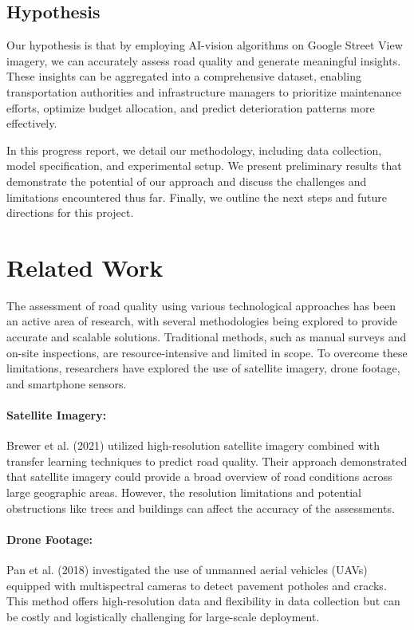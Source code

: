 \documentclass{article}
\begin{document}
\subsection{Hypothesis}
Our hypothesis is that by employing AI-vision algorithms on Google Street View imagery, we can accurately assess road quality and generate meaningful insights. These insights can be aggregated into a comprehensive dataset, enabling transportation authorities and infrastructure managers to prioritize maintenance efforts, optimize budget allocation, and predict deterioration patterns more effectively.

In this progress report, we detail our methodology, including data collection, model specification, and experimental setup. We present preliminary results that demonstrate the potential of our approach and discuss the challenges and limitations encountered thus far. Finally, we outline the next steps and future directions for this project.


\section{Related Work}

The assessment of road quality using various technological approaches has been an active area of research, with several methodologies being explored to provide accurate and scalable solutions. Traditional methods, such as manual surveys and on-site inspections, are resource-intensive and limited in scope. To overcome these limitations, researchers have explored the use of satellite imagery, drone footage, and smartphone sensors.

\paragraph{Satellite Imagery:}
Brewer et al. (2021) utilized high-resolution satellite imagery combined with transfer learning techniques to predict road quality. Their approach demonstrated that satellite imagery could provide a broad overview of road conditions across large geographic areas. However, the resolution limitations and potential obstructions like trees and buildings can affect the accuracy of the assessments.

\paragraph{Drone Footage:}
Pan et al. (2018) investigated the use of unmanned aerial vehicles (UAVs) equipped with multispectral cameras to detect pavement potholes and cracks. This method offers high-resolution data and flexibility in data collection but can be costly and logistically challenging for large-scale deployment.
\end{document}
